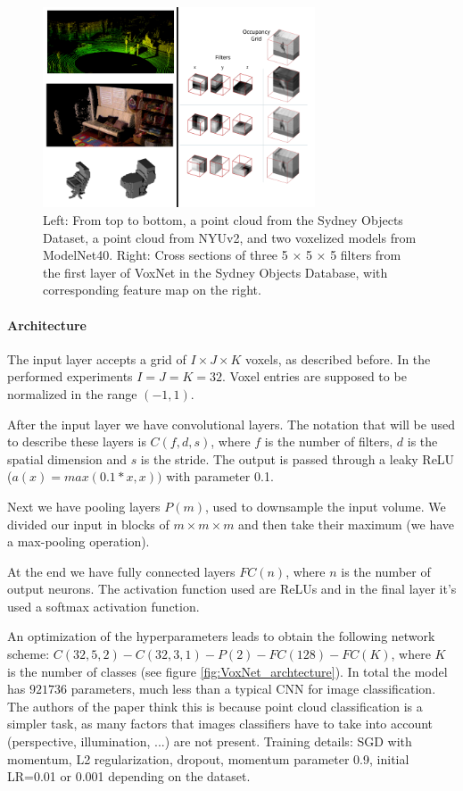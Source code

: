 \begin{figure}[ht]
    \centering
    \captionsetup{width=.9\linewidth}
    \includegraphics[width=0.72\textwidth]{images/VOLUM_cloud_filtpng.png}
    \caption{Left: From top to bottom, a point cloud from the Sydney Objects Dataset,
a point cloud from NYUv2, and two voxelized models from ModelNet40.
Right: Cross sections of three 5 × 5 × 5 filters from the first layer of VoxNet in the Sydney Objects Database, with corresponding feature map on the right.}
    \label{fig:VOLUM_cloud_filtpng}
\end{figure}

\paragraph{Architecture}
The input layer accepts a grid of $I \times J \times K$ voxels, as described before. In the performed experiments $I = J = K = 32$. Voxel entries are supposed to be normalized in the range $(-1,1)$.

After the input layer we have convolutional layers. The notation that will be used to describe these layers is $C(f,d,s)$, where $f$ is the number of filters, $d$ is the spatial dimension and $s$ is the stride. The output is passed through a leaky ReLU ($a(x)=max(0.1*x , x)
)$ with parameter 0.1.

Next we have pooling layers $P(m)$, used to downsample the input volume. We divided our input in blocks of $m \times m \times m$ and then take their maximum (we have a max-pooling operation).

At the end we have fully connected layers $FC(n)$, where $n$ is the number of output neurons. The activation function used are ReLUs and in the final layer it's used a softmax activation function.

An optimization of the hyperparameters leads to obtain the following network scheme:
$C(32, 5, 2) - C(32, 3, 1)-P(2)-F C(128)-F C(K)$, where $K$ is the number of classes (see figure \ref{fig:VoxNet_archtecture}). In total the model has $921736$ parameters, much less than a typical CNN for image classification. The authors of the paper think this is because point cloud classification is a simpler task, as many factors that images classifiers have to take into account (perspective, illumination, ...) are not present. Training details: SGD with momentum, L2 regularization, dropout, momentum parameter 0.9, initial LR=0.01 or 0.001 depending on the dataset.


